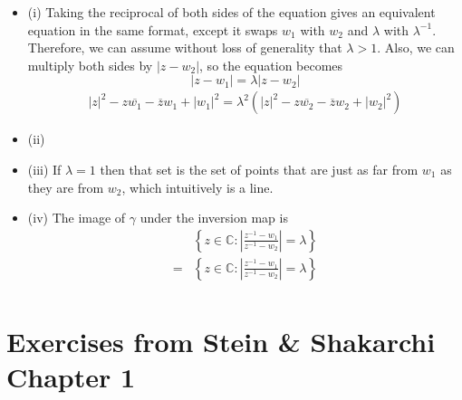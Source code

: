 \documentclass[12pt]{article}
\begin{document}
\begin{itemize}
    \item (i) Taking the reciprocal of both sides of the equation gives an equivalent equation in the same format, except it swaps $w_1$ with $w_2$ and $\lambda$ with $\lambda^{-1}$. Therefore, we can assume without loss of generality that $\lambda > 1$. Also, we can multiply both sides by $|z-w_2|$, so the equation becomes
        \[ |z-w_1| = \lambda |z-w_2| \]
        \begin{align*}
            |z|^2-z \overline{w_1}-\overline{z} w_1 + |w_1|^2 = \lambda^2 \left( |z|^2-z \overline{w_2}-\overline{z} w_2 + |w_2|^2 \right)
        \end{align*}
    \item (ii)
    \item (iii) If $\lambda=1$ then that set is the set of points that are just as far from $w_1$ as they are from $w_2$, which intuitively is a line.
    \item (iv) The image of $\gamma$ under the inversion map is
        \begin{align*}
            & \left\{ z \in \mathbb{C}: \left| \frac{z^{-1} - w_1}{z^{-1} - w_2} \right| = \lambda \right\} \\
            =& \left\{ z \in \mathbb{C}: \left| \frac{z^{-1} - w_1}{z^{-1} - w_2} \right| = \lambda \right\} \\
        \end{align*}
\end{itemize}

\section{Exercises from Stein \& Shakarchi Chapter 1}

\noindent{}\bigskip
\end{document}
